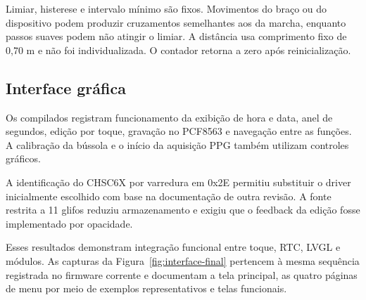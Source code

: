\documentclass[a4paper,12pt]{article}
\begin{document}
Limiar, histerese e intervalo m\'inimo s\~ao fixos. Movimentos do bra\c{c}o ou do dispositivo podem produzir cruzamentos semelhantes aos da marcha, enquanto passos suaves podem n\~ao atingir o limiar. A dist\^ancia usa comprimento fixo de 0,70 m e n\~ao foi individualizada. O contador retorna a zero ap\'os reinicializa\c{c}\~ao.


\subsection{Interface gr\'afica}


Os compilados registram funcionamento da exibi\c{c}\~ao de hora e data, anel de segundos, edi\c{c}\~ao por toque, grava\c{c}\~ao no PCF8563 e navega\c{c}\~ao entre as fun\c{c}\~oes. A calibra\c{c}\~ao da b\'ussola e o in\'icio da aquisi\c{c}\~ao PPG tamb\'em utilizam controles gr\'aficos.


A identifica\c{c}\~ao do CHSC6X por varredura em 0x2E permitiu substituir o driver inicialmente escolhido com base na documenta\c{c}\~ao de outra revis\~ao. A fonte restrita a 11 glifos reduziu armazenamento e exigiu que o feedback da edi\c{c}\~ao fosse implementado por opacidade.


Esses resultados demonstram integra\c{c}\~ao funcional entre toque, RTC, LVGL e m\'odulos. As capturas da Figura~\ref{fig:interface-final} pertencem \`a mesma sequ\^encia registrada no firmware corrente e documentam a tela principal, as quatro p\'aginas de menu por meio de exemplos representativos e telas funcionais.
\end{document}
